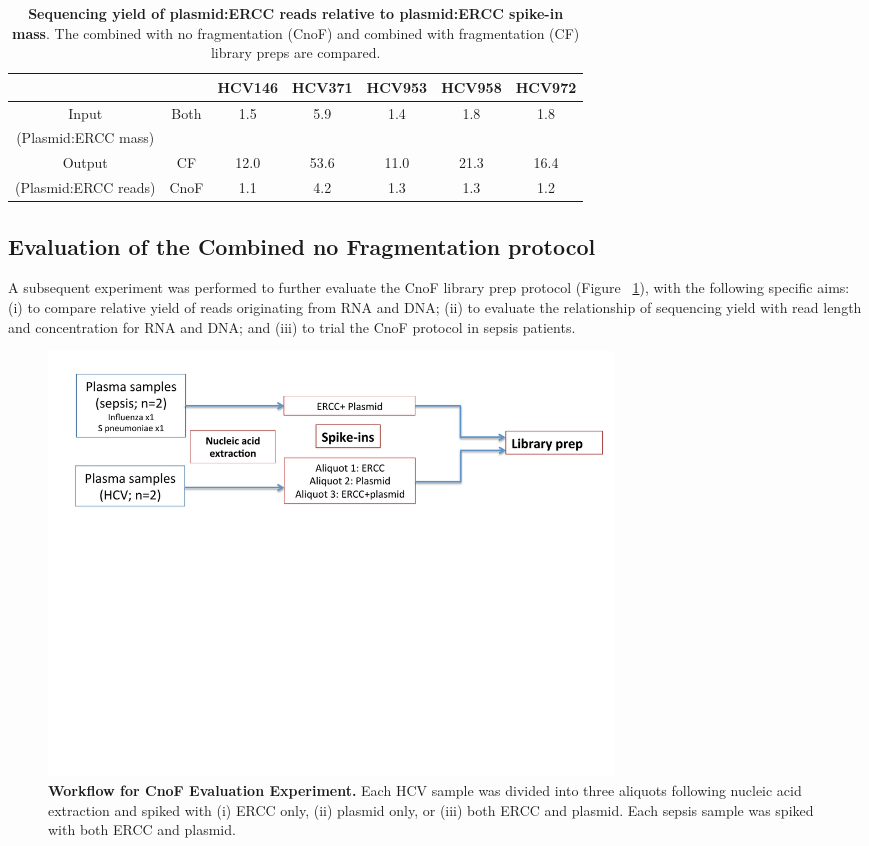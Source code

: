\begin{table}[htbp]
\begin{center}
\begin{tabular}{|c|c|c|c|c|c|c|}
\hline
&& HCV146 & HCV371 & HCV953 & HCV958 & HCV972\\
\hline
Input & Both & 1.5 & 5.9 & 1.4 & 1.8 & 1.8\\
(Plasmid:ERCC mass) &&&&&&\\
\hline
Output & CF & 12.0 & 53.6 & 11.0 & 21.3 & 16.4\\
(Plasmid:ERCC reads)& CnoF & 1.1 & 4.2 & 1.3 & 1.3 & 1.2\\
\hline
\end{tabular}
\end{center}
\smallskip
\caption[Combined library preparations: plasmid to ERCC ratios]{\textbf{Sequencing yield of plasmid:ERCC reads relative to plasmid:ERCC spike-in mass}. The combined with no fragmentation (CnoF) and combined with fragmentation (CF) library preps are compared.}
\label{tab:plasmidERCC}
\end{table}
\smallskip


\subsection{Evaluation of the Combined no Fragmentation protocol} 
A subsequent experiment was performed to further evaluate the CnoF library prep protocol (Figure ~\ref{fig:Exp2}), with the following specific aims: (i) to compare relative yield of reads originating from RNA and DNA; (ii) to evaluate the relationship of sequencing yield with read length and concentration for RNA and DNA; and (iii) to trial the CnoF protocol in sepsis patients.

\begin{figure}[htbp]
\centering
\includegraphics[width=150mm, trim={0 10cm 0 0},clip]{./Results1/Images/Exp2.pdf}
\caption[Combined no fragmentation library preparation evaluation]{\textbf{Workflow for CnoF Evaluation Experiment.} Each HCV sample was divided into three aliquots following nucleic acid extraction and spiked with (i) ERCC only, (ii) plasmid only, or (iii) both ERCC and plasmid. Each sepsis sample was spiked with both ERCC and plasmid.}
\label{fig:Exp2}
\end{figure}

